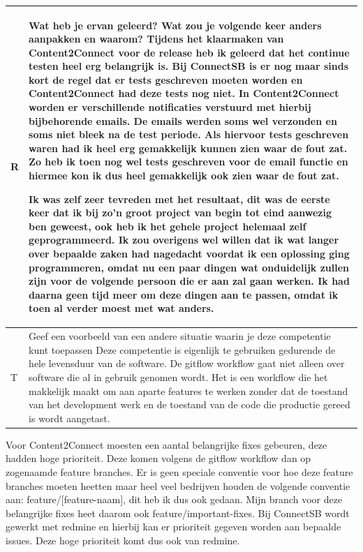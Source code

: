 \begin{tabularx}{\textwidth}{| l | X |}
\\
\hline
R & Wat heb je ervan geleerd? Wat zou je volgende keer anders aanpakken en waarom?
\newline
\newline
Tijdens het klaarmaken van Content2Connect voor de release heb ik geleerd dat het continue testen heel erg belangrijk is. Bij ConnectSB is er nog maar sinds kort de regel dat er tests geschreven moeten worden en Content2Connect had deze tests nog niet. In Content2Connect worden er verschillende notificaties verstuurd met hierbij bijbehorende emails. De emails werden soms wel verzonden en soms niet bleek na de test periode. Als hiervoor tests geschreven waren had ik heel erg gemakkelijk kunnen zien waar de fout zat. Zo heb ik toen nog wel tests geschreven voor de email functie en hiermee kon ik dus heel gemakkelijk ook zien waar de fout zat.

\newline
Ik was zelf zeer tevreden met het resultaat, dit was de eerste keer dat ik bij zo'n groot project van begin tot eind aanwezig ben geweest, ook heb ik het gehele project helemaal zelf geprogrammeerd. Ik zou overigens wel willen dat ik wat langer over bepaalde zaken had nagedacht voordat ik een oplossing ging programmeren, omdat nu een paar dingen wat onduidelijk zullen zijn voor de volgende persoon die er aan zal gaan werken. Ik had daarna geen tijd meer om deze dingen aan te passen, omdat ik toen al verder moest met wat anders.
\\
\hline
T & Geef een voorbeeld van een andere situatie waarin je deze competentie kunt toepassen
\newline
\newline
Deze competentie is eigenlijk te gebruiken gedurende de hele levensduur van de software. De \gls{gitflow} workflow gaat niet alleen over software die al in gebruik genomen wordt. Het is een workflow die het makkelijk maakt om aan aparte features te werken zonder dat de toestand van het development werk en de toestand van de code die productie gereed is wordt aangetast.
\\
\hline
\end{tabularx}
Voor Content2Connect moesten een aantal belangrijke fixes gebeuren, deze hadden hoge prioriteit. Deze komen volgens de \gls{gitflow} workflow dan op zogenaamde feature branches. Er is geen speciale conventie voor hoe deze feature branches moeten heetten maar heel veel bedrijven houden de volgende conventie aan: feature/[feature-naam], dit heb ik dus ook gedaan. Mijn branch voor deze belangrijke fixes heet daarom ook feature/important-fixes. Bij ConnectSB wordt gewerkt met \gls{redmine} en hierbij kan er prioriteit gegeven worden aan bepaalde issues. Deze hoge prioriteit komt dus ook van \gls{redmine}.

